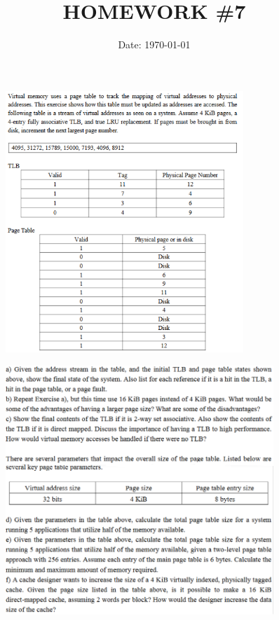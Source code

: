 \documentclass[cn,12pt]{homework}
\title{HOMEWORK \#7} %
\date{Date: \today} %
\institute{ZHEJIANG UNIVERSITY\quad COLLEGE OF INFORMATION SCIENCE AND ELECTRONICS ENGINEERING} %
\begin{document}
\maketitle



\begin{problem}
\begin{figure}[H]
  \centering
  \includegraphics[width=0.8\textwidth]{./figures/image1.png}
  \label{fig:pro1}
\end{figure}
\begin{figure}[H]
  \centering
  \includegraphics[width=0.9\textwidth]{./figures/image1_2.png}
  \label{fig:pro1}
\end{figure}
\end{problem}
\end{document}
